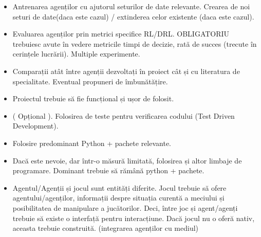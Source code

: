 \documentclass[12pt]{article}
\begin{document}
\begin{itemize}
        \item Antrenarea agenților cu ajutorul seturilor de date relevante. Crearea de noi seturi de date(daca este cazul) / extinderea celor existente (daca este cazul).
        \item Evaluarea agenților prin metrici specifice RL/DRL. OBLIGATORIU trebuiesc avute în vedere metricile timpi de decizie, rată de succes (trecute în cerințele lucrării). Multiple experimente.
        \item Comparații atât între agenții dezvoltați în proiect cât și cu literatura de specialitate. Eventual propuneri de îmbunătățire.
        \item Proiectul trebuie să fie funcțional și ușor de folosit.
        \item ( Opțional ). Folosirea de teste pentru verificarea codului (Test Driven Development).
        \item Folosire predominant Python + pachete relevante.
        \item Dacă este nevoie, dar într-o măsură limitată, folosirea și altor limbaje de programare. Dominant trebuie să rămână python + pachete.
        \item Agentul/Agenții și jocul sunt entități diferite. Jocul trebuie să ofere agentului/agenților, informații despre situația curentă a meciului și posibilitatea de manipulare a jucătorilor. Deci, între joc și agent/agenți trebuie să existe o interfață pentru interacțiune. Dacă jocul nu o oferă nativ, aceasta trebuie construită. (integrarea agenților cu mediul)
    \end{itemize}
\end{document}

